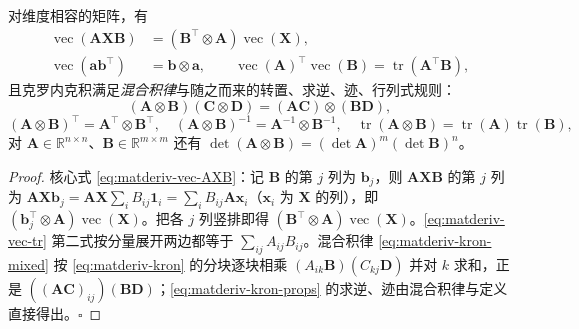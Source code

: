 \begin{proposition}\label{prop:matderiv-vec-kron}
对维度相容的矩阵，有\cite{magnus2019matrix,barfoot2024state}
\begin{align}
  \operatorname{vec}(\mathbf{A}\mathbf{X}\mathbf{B})&=(\mathbf{B}^\top\otimes\mathbf{A})\operatorname{vec}(\mathbf{X}),
  \label{eq:matderiv-vec-AXB}\\
  \operatorname{vec}(\mathbf{a}\mathbf{b}^\top)&=\mathbf{b}\otimes\mathbf{a},\qquad
  \operatorname{vec}(\mathbf{A})^\top\operatorname{vec}(\mathbf{B})=\operatorname{tr}(\mathbf{A}^\top\mathbf{B}),
  \label{eq:matderiv-vec-tr}
\end{align}
且克罗内克积满足\emph{混合积律}与随之而来的转置、求逆、迹、行列式规则：
\begin{equation}
  (\mathbf{A}\otimes\mathbf{B})(\mathbf{C}\otimes\mathbf{D})=(\mathbf{A}\mathbf{C})\otimes(\mathbf{B}\mathbf{D}),
  \label{eq:matderiv-kron-mixed}
\end{equation}
\begin{equation}
  (\mathbf{A}\otimes\mathbf{B})^\top=\mathbf{A}^\top\otimes\mathbf{B}^\top,\quad
  (\mathbf{A}\otimes\mathbf{B})^{-1}=\mathbf{A}^{-1}\otimes\mathbf{B}^{-1},\quad
  \operatorname{tr}(\mathbf{A}\otimes\mathbf{B})=\operatorname{tr}(\mathbf{A})\operatorname{tr}(\mathbf{B}),
  \label{eq:matderiv-kron-props}
\end{equation}
对 $\mathbf{A}\in\mathbb{R}^{n\times n}$、$\mathbf{B}\in\mathbb{R}^{m\times m}$ 还有 $\det(\mathbf{A}\otimes\mathbf{B})=(\det\mathbf{A})^m(\det\mathbf{B})^n$。
\end{proposition}
\begin{proof}
核心式 \cref{eq:matderiv-vec-AXB}：记 $\mathbf{B}$ 的第 $j$ 列为 $\mathbf{b}_j$，则 $\mathbf{A}\mathbf{X}\mathbf{B}$ 的第 $j$ 列为 $\mathbf{A}\mathbf{X}\mathbf{b}_j=\mathbf{A}\mathbf{X}\sum_i B_{ij}\mathbf{1}_i=\sum_i B_{ij}\mathbf{A}\mathbf{x}_i$（$\mathbf{x}_i$ 为 $\mathbf{X}$ 的列），即 $(\mathbf{b}_j^\top\otimes\mathbf{A})\operatorname{vec}(\mathbf{X})$。把各 $j$ 列竖排即得 $(\mathbf{B}^\top\otimes\mathbf{A})\operatorname{vec}(\mathbf{X})$。\cref{eq:matderiv-vec-tr} 第二式按分量展开两边都等于 $\sum_{ij}A_{ij}B_{ij}$。混合积律 \cref{eq:matderiv-kron-mixed} 按 \cref{eq:matderiv-kron} 的分块逐块相乘 $(A_{ik}\mathbf{B})(C_{kj}\mathbf{D})$ 并对 $k$ 求和，正是 $((\mathbf{A}\mathbf{C})_{ij})(\mathbf{B}\mathbf{D})$；\cref{eq:matderiv-kron-props} 的求逆、迹由混合积律与定义直接得出。\hfill$\square$
\end{proof}

